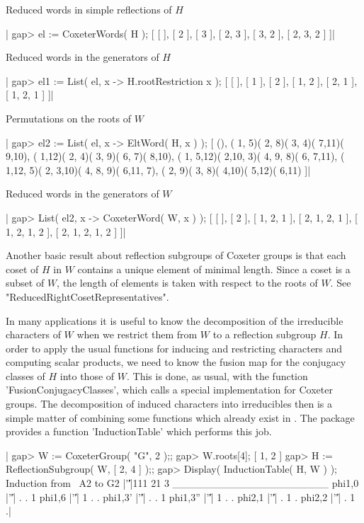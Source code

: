 Reduced words in simple reflections of $H$\:

|    gap> el := CoxeterWords( H );
    [ [  ], [ 2 ], [ 3 ], [ 2, 3 ], [ 3, 2 ], [ 2, 3, 2 ] ]|

Reduced words in the generators of $H$\:

|    gap> el1 := List( el, x -> H.rootRestriction{ x } );
    [ [  ], [ 1 ], [ 2 ], [ 1, 2 ], [ 2, 1 ], [ 1, 2, 1 ] ]|

Permutations on the roots of $W$\:

|    gap> el2 := List( el, x -> EltWord( H, x ) );
    [ (), ( 1, 5)( 2, 8)( 3, 4)( 7,11)( 9,10),
      ( 1,12)( 2, 4)( 3, 9)( 6, 7)( 8,10),
      ( 1, 5,12)( 2,10, 3)( 4, 9, 8)( 6, 7,11),
      ( 1,12, 5)( 2, 3,10)( 4, 8, 9)( 6,11, 7),
      ( 2, 9)( 3, 8)( 4,10)( 5,12)( 6,11) ]|

Reduced words in the generators of $W$\:

|    gap> List( el2, x -> CoxeterWord( W, x ) );
    [ [  ], [ 2 ], [ 1, 2, 1 ], [ 2, 1, 2, 1 ], [ 1, 2, 1, 2 ],
      [ 2, 1, 2, 1, 2 ] ]|

Another  basic  result  about  reflection subgroups  of  Coxeter  groups
is  that  each  coset  of  $H$  in $W$  contains  a  unique  element  of
minimal  length.  Since  a  coset  is   a  subset  of  $W$,  the  length
of  elements   is  taken  with  respect   to  the  roots  of   $W$.  See
"ReducedRightCosetRepresentatives".


In  many  applications  it  is  useful  to  know  the  decomposition  of
the  irreducible  characters of  $W$  when  we  restrict them  from  $W$
to  a reflection  subgroup  $H$.  In order  to  apply  the usual  {\GAP}
functions for  inducing and restricting characters  and computing scalar
products, we  need to know the  fusion map for the  conjugacy classes of
$H$  into  those  of $W$.  This  is  done,  as  usual, with  the  {\GAP}
function 'FusionConjugacyClasses', which  calls a special implementation
for  Coxeter  groups.  The  decomposition  of  induced  characters  into
irreducibles then is  a simple matter of combining  some functions which
already  exist in  {\GAP}.  The package  {\CHEVIE}  provides a  function
'InductionTable' which performs this job.

|    gap> W := CoxeterGroup( "G", 2 );;
    gap> W.roots[4];
    [ 1, 2 ]
    gap> H := ReflectionSubgroup( W, [ 2, 4 ] );;
    gap> Display( InductionTable( H, W ) );
    Induction from ~A2 to G2
               |'\|'|111 21 3
    _____________________
    phi{1,0}   |'\|'|  .  . 1
    phi{1,6}   |'\|'|  1  . .
    phi{1,3}'  |'\|'|  .  . 1
    phi{1,3}'' |'\|'|  1  . .
    phi{2,1}   |'\|'|  .  1 .
    phi{2,2}   |'\|'|  .  1 .|

